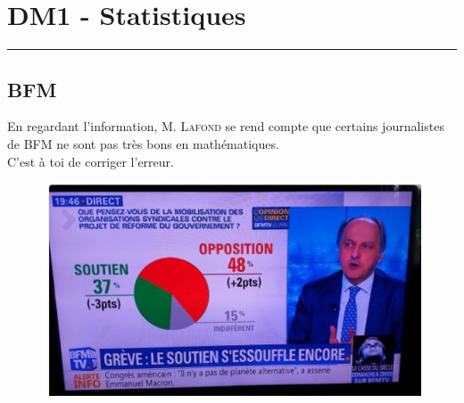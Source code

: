 \documentclass[12pt]{article}
\newcommand{\horrule}[1]{\rule{\linewidth}{#1}} %
\begin{document}

\newtheorem{Definition}{Définition}
\newtheorem{Theorem}{Théorème}
\newtheorem{Proposition}{Propriété}

\renewcommand{\labelitemi}{$\bullet$}
\renewcommand{\labelitemii}{$\circ$}

\setlength{\columnseprule}{0pt}

\section*{DM1 - Statistiques}
\horrule{2px}

\subsection*{BFM}

\begin{multicols}{2}
En regardant l'information, \textsc{M. Lafond} se rend compte que certains journalistes de \textsc{BFM} ne sont pas très bons en mathématiques.\\
C'est à toi de corriger l'erreur. 

\begin{figure}[H]
	\centering
	\includegraphics[width=\linewidth]{3x1-statistiques/sources/bfm.jpg}
\end{figure}

\end{multicols}
\end{document}
